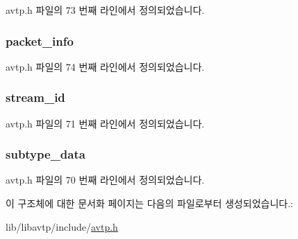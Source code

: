 avtp.\+h 파일의 73 번째 라인에서 정의되었습니다.

\subsubsection[{\texorpdfstring{packet\+\_\+info}{packet_info}}]{ packet\+\_\+info}\hypertarget{structavtp__stream__pdu_a737b6c4ff9f6954da39283e7351cbf58}{}\label{structavtp__stream__pdu_a737b6c4ff9f6954da39283e7351cbf58}


avtp.\+h 파일의 74 번째 라인에서 정의되었습니다.

\subsubsection[{\texorpdfstring{stream\+\_\+id}{stream_id}}]{ stream\+\_\+id}\hypertarget{structavtp__stream__pdu_af5af7b461263e29ceb91a8d3a8bc2c97}{}\label{structavtp__stream__pdu_af5af7b461263e29ceb91a8d3a8bc2c97}


avtp.\+h 파일의 71 번째 라인에서 정의되었습니다.

\subsubsection[{\texorpdfstring{subtype\+\_\+data}{subtype_data}}]{ subtype\+\_\+data}\hypertarget{structavtp__stream__pdu_a3210e9f18fdc9c29cef7600c4d1e67e9}{}\label{structavtp__stream__pdu_a3210e9f18fdc9c29cef7600c4d1e67e9}


avtp.\+h 파일의 70 번째 라인에서 정의되었습니다.



이 구조체에 대한 문서화 페이지는 다음의 파일로부터 생성되었습니다.\+:\begin{DoxyCompactItemize}
\item 
lib/libavtp/include/\hyperlink{avtp_8h}{avtp.\+h}\end{DoxyCompactItemize}
